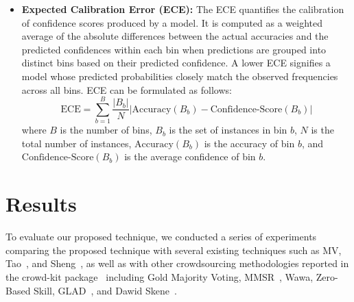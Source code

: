 \documentclass[default]{bst/sn-jnl_mine}%
\begin{document}
\begin{itemize}
\begin{equation}
    \end{equation}
    \item \textbf{Expected Calibration Error (ECE):}  The ECE quantifies the calibration of  confidence scores produced by a model. It is computed as a weighted average of the absolute differences between the actual accuracies and the predicted confidences within each bin when predictions are grouped into distinct bins based on their predicted confidence. A lower ECE signifies a model whose predicted probabilities closely match the observed frequencies across all bins. ECE can be formulated as follows:
    \begin{equation}
        \text{ECE} = \sum_{b=1}^{B} \frac{ \vert B_b \vert }{N} \left\vert {\text{Accuracy} ( B_{b} ) - \text{Confidence-Score}(B_b)} \right\vert
    \end{equation}
    where $B$ is the number of bins, $B_b$ is the set of instances in bin $b$, $N$ is the total number of instances, $\text{Accuracy} (B_b)$ is the accuracy of bin $b$, and $\text{Confidence-Score} (B_b)$ is the average confidence of bin $b$.
\end{itemize}
\section{Results}\label{sec:crowd.results}
To evaluate our proposed technique, we conducted a series of experiments comparing the proposed technique with several existing techniques such as MV, Tao~\cite{tao_Label_2020}, and Sheng~\cite{sheng_Majority_2019}, as well as with other crowdsourcing methodologies reported in the crowd-kit package~\cite{ustalov_learning_2021} including Gold Majority Voting, MMSR~\cite{ma_Adversarial_2020}, Wawa, Zero-Based Skill, GLAD~\cite{whitehill_Whose_2009}, and Dawid Skene~\cite{dawid_Maximum_1979}.
\end{document}
